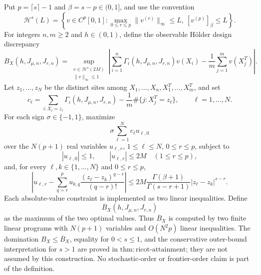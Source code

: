 Put \(p=\lceil s\rceil-1\) and \(\beta=s-p\in(0,1]\), and use the convention
\[
\mathcal H^s(L)=\left\{v\in C^p[0,1]:
\max_{0\le r\le p}\|v^{(r)}\|_\infty\le L,
\ [v^{(p)}]_{\beta}\le L\right\}.
\]
For integers \(n,m\ge2\) and \(h\in(0,1)\), define the observable H\"older design discrepancy
\[
B_X(h,J_{\mu,n},J_{r,n})=
\sup_{\substack{v\in\mathcal H^s(2M)\\ \|v\|_\infty\le1}}
\left|\sum_{i=1}^n\Gamma_i(h,J_{\mu,n},J_{r,n})v(X_i)-\frac1m\sum_{j=1}^mv(X_j^T)\right|.
\]
Let \(z_1,\ldots,z_N\) be the distinct sites among \(X_1,\ldots,X_n,X_1^T,\ldots,X_m^T\), and set
\[
c_\ell=\sum_{i:X_i=z_\ell}\Gamma_i(h,J_{\mu,n},J_{r,n})
-\frac1m\#\{j:X_j^T=z_\ell\},
\qquad \ell=1,\ldots,N.
\]
For each sign \(\sigma\in\{-1,1\}\), maximize
\[
\sigma\sum_{\ell=1}^N c_\ell u_{\ell,0}
\]
over the \(N(p+1)\) real variables \(u_{\ell,r}\), \(1\le\ell\le N\), \(0\le r\le p\), subject to
\[
|u_{\ell,0}|\le1,
\qquad |u_{\ell,r}|\le2M\quad(1\le r\le p),
\]
and, for every \(\ell,k\in\{1,\ldots,N\}\) and \(0\le r\le p\),
\[
\left|u_{\ell,r}-\sum_{q=r}^p
u_{k,q}\frac{(z_\ell-z_k)^{q-r}}{(q-r)!}\right|
\le
2M\frac{\Gamma(\beta+1)}{\Gamma(s-r+1)}|z_\ell-z_k|^{s-r}.
\]
Each absolute-value constraint is implemented as two linear inequalities. Define
\[
\overline B_X(h,J_{\mu,n},J_{r,n})
\]
as the maximum of the two optimal values. Thus \(\overline B_X\) is computed by two finite linear programs with \(N(p+1)\) variables and \(O(N^2p)\) linear inequalities. The domination \(B_X\le\overline B_X\), equality for \(0<s\le1\), and the conservative outer-bound interpretation for \(s>1\) are proved in \(\mathrm{thm:ricot\text{-}attainment}\); they are not assumed by this construction. No stochastic-order or frontier-order claim is part of the definition.